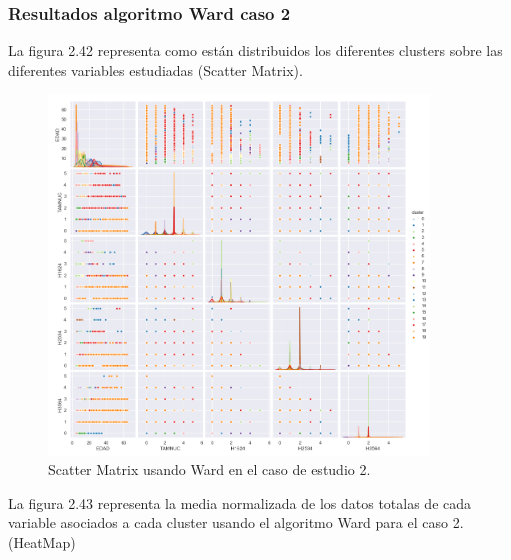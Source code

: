 
	\subsubsection{Resultados algoritmo Ward caso 2}


	La figura 2.42 representa como están distribuidos los diferentes clusters sobre las diferentes variables estudiadas
	(Scatter Matrix).\\

	\begin{figure}[htb]
		\centering
		\includegraphics[width=0.9\textwidth]{./imagenes/caso2/scatterMatrix_caso2_Ward}
		\caption{Scatter Matrix usando Ward en el caso de estudio 2.} \label{fig:1}
	\end{figure}

	La figura 2.43 representa la media normalizada de los datos totalas de cada variable asociados
	a cada cluster usando el algoritmo Ward para el caso 2. (HeatMap) \\

